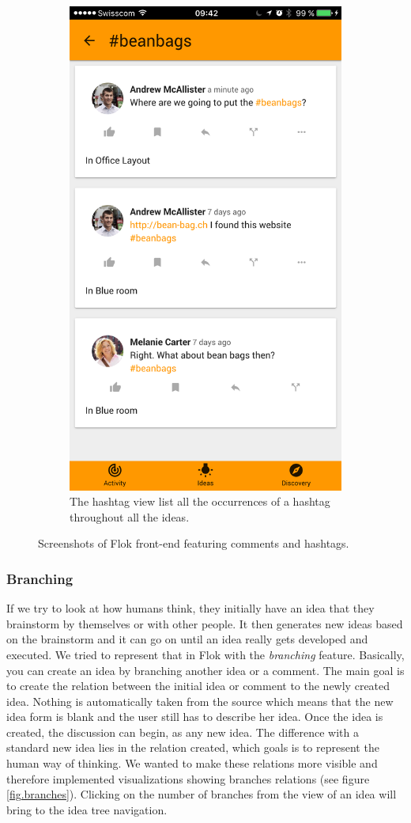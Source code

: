 \documentclass[a4paper,12pt, oneside]{article}
\begin{document}
\begin{figure}[!htb]
\begin{subfigure}[t]{.48\textwidth}
        \includegraphics[width=.67\textwidth]{images/hashtagView.png}
        \caption{The hashtag view list all the occurrences of a hashtag throughout all the ideas.}
        \label{fig.hashtagView}
    \end{subfigure}
    \caption{Screenshots of Flok front-end featuring comments and hashtags.}
\end{figure}

\subsubsection{Branching}
\label{sec.branching}
If we try to look at how humans think, they initially have an idea that they brainstorm by themselves or with other people.
It then generates new ideas based on the brainstorm and it can go on until an idea really gets developed and executed.
We tried to represent that in Flok with the \emph{branching} feature.
Basically, you can create an idea by branching another idea or a comment.
The main goal is to create the relation between the initial idea or comment to the newly created idea.
Nothing is automatically taken from the source which means that the new idea form is blank and the user still has to describe her idea.
Once the idea is created, the discussion can begin, as any new idea.
The difference with a standard new idea lies in the relation created, which goals is to represent the human way of thinking.
We wanted to make these relations more visible and therefore implemented visualizations showing branches relations (see figure \ref{fig.branches}).
Clicking on the number of branches from the view of an idea will bring to the idea tree navigation.
\end{document}
